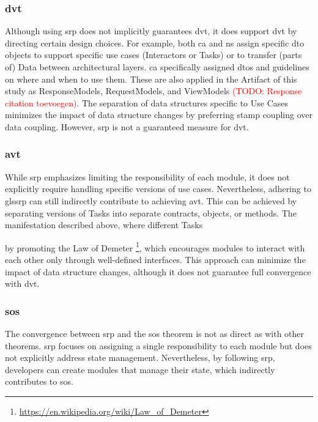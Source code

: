 \subsubsection{\acrlong*{dvt}} 

Although using \gls{srp} does not implicitly guarantees \gls{dvt}, it does support
\gls{dvt} by directing certain design choices. For example, both \gls{ca} and \gls{ns}
assign specific \gls{dto} objects to support specific use cases (Interactors or Tasks) or
to transfer (parts of) Data between architectural layers. \gls{ca} specifically assigned
\glspl{dto} and guidelines on where and when to use them. These are also applied in the
Artifact of this study as ResponseModels, RequestModels, and ViewModels
\parencites{koks_requestmodels_2023,koks_viewmodels_2023} \textcolor{red}{(TODO: Response
citation toevoegen)}. The separation of data structures specific to Use Cases minimizes
the impact of data structure changes by preferring stamp coupling over data coupling.
However, \gls{srp} is not a guaranteed measure for \gls{dvt}.

\subsubsection{\acrlong*{avt}} 

While \gls{srp} emphasizes limiting the responsibility of each module, it does not
explicitly require handling specific versions of use cases. Nevertheless, adhering to
gls{srp} can still indirectly contribute to achieving \gls{avt}. This can be achieved by
separating versions of Tasks into separate contracts, objects, or methods. The
manifestation described above, where different Tasks


by promoting the Law of
Demeter \footnote{\url{https://en.wikipedia.org/wiki/Law_of_Demeter}}, which encourages
modules to interact with each other only through well-defined interfaces. This approach
can minimize the impact of data structure changes, although it does not guarantee full
convergence with \gls{dvt}.

\subsubsection{\acrlong*{sos}} The convergence between \gls{srp} and the \gls{sos} theorem
is not as direct as with other theorems. \gls{srp} focuses on assigning a single
responsibility to each module but does not explicitly address state management.
Nevertheless, by following \gls{srp}, developers can create modules that manage their
state, which indirectly contributes to \gls{sos}.